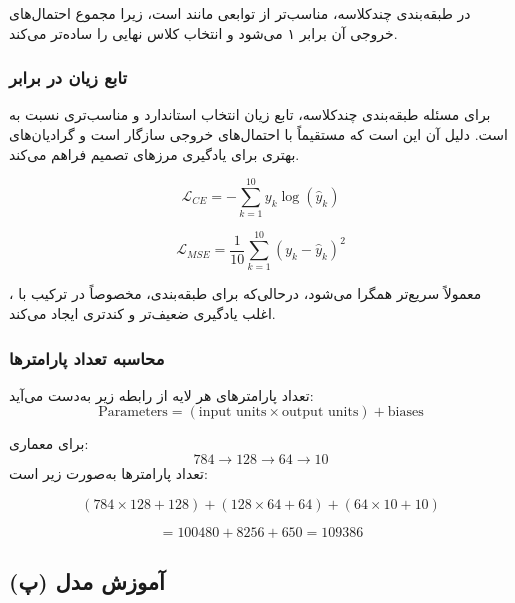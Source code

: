 \documentclass[12pt,a4paper]{article}
\begin{document}
\begin{tcolorbox}[
	colback=softgreen,
	colframe=mygreen,
	title=چرا \lr{Softmax}؟
	]
	در طبقه‌بندی چندکلاسه،  مناسب‌تر از توابعی مانند  است، زیرا مجموع احتمال‌های خروجی آن برابر ۱ می‌شود و انتخاب کلاس نهایی را ساده‌تر می‌کند.
\end{tcolorbox}

\subsubsection{تابع زیان  در برابر }

برای مسئله طبقه‌بندی چندکلاسه، تابع زیان  انتخاب استاندارد و مناسب‌تری نسبت به  است. دلیل آن این است که  مستقیماً با احتمال‌های خروجی  سازگار است و گرادیان‌های بهتری برای یادگیری مرزهای تصمیم فراهم می‌کند.

\[
\mathcal{L}_{CE} = - \sum_{k=1}^{10} y_k \log(\hat{y}_k)
\]

\[
\mathcal{L}_{MSE} = \frac{1}{10} \sum_{k=1}^{10} (y_k - \hat{y}_k)^2
\]

\begin{tcolorbox}[
	colback=softorange,
	colframe=golden,
	title=جمع‌بندی مقایسه,
	coltitle=black
	]
	 معمولاً سریع‌تر همگرا می‌شود، درحالی‌که  برای طبقه‌بندی، مخصوصاً در ترکیب با ، اغلب یادگیری ضعیف‌تر و کندتری ایجاد می‌کند.
\end{tcolorbox}

\subsubsection{محاسبه تعداد پارامترها}

تعداد پارامترهای هر لایه از رابطه زیر به‌دست می‌آید:
\[
\text{Parameters} = (\text{input units} \times \text{output units}) + \text{biases}
\]

برای معماری:
\[
784 \rightarrow 128 \rightarrow 64 \rightarrow 10
\]
تعداد پارامترها به‌صورت زیر است:

\[
(784 \times 128 + 128) + (128 \times 64 + 64) + (64 \times 10 + 10)
\]

\[
= 100480 + 8256 + 650 = 109386
\]



\subsection{(پ) آموزش مدل}
\end{document}
